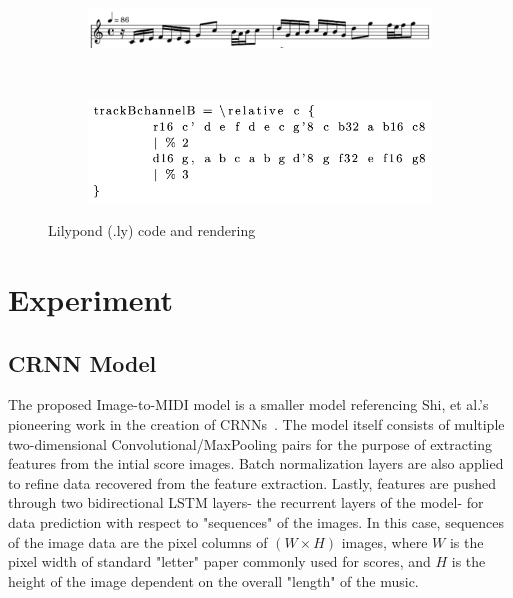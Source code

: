 \documentclass[sigconf]{acmart}
\begin{document}
\begin{figure}
	\begin{subfigure}
		\centering
		\includegraphics[width = .8\linewidth]{./figures/lilypond-snippet.png}
	\end{subfigure}
	~
	\begin{subfigure}
		\centering
		\includegraphics[width = .8\linewidth]{./figures/lilypond-code.png}
	\end{subfigure}
	\caption{Lilypond (.ly) code and rendering}
	\label{fig:lilypond-example}
\end{figure}

\section{Experiment}

\subsection{CRNN Model}
The proposed Image-to-MIDI model is a smaller model referencing Shi, et al.'s pioneering work in the creation of CRNNs~\cite{shi2015endtoend}.
The model itself consists of multiple two-dimensional Convolutional/MaxPooling pairs for the purpose of extracting features from the intial score images.
Batch normalization layers are also applied to refine data recovered from the feature extraction.
Lastly, features are pushed through two bidirectional LSTM layers- the recurrent layers of the model- for data prediction with respect to "sequences" of the images.
In this case, sequences of the image data are the pixel columns of $(W \times H)$ images, where $W$ is the pixel width of standard "letter" paper commonly used for scores, and $H$ is the height of the image dependent on the overall "length" of the music.
\end{document}
